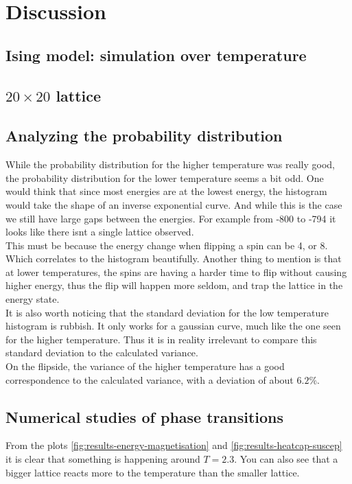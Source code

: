 \documentclass[../main.tex]{subfiles}
\begin{document}
\section{Discussion}

\subsection{Ising model: simulation over temperature}




\subsection{$20 \times 20$ lattice}




\subsection{Analyzing the probability distribution}
While the probability distribution for the higher temperature was really good, the probability distribution for the lower temperature seems a bit odd. One would think that since most energies are at the lowest energy, the histogram would take the shape of an inverse exponential curve. And while this is the case we still have large gaps between the energies. For example from -800 to -794 it looks like there isnt a single lattice observed. \\
This must be because the energy change when flipping a spin can be 4, or 8. Which correlates to the histogram beautifully. Another thing to mention is that at lower temperatures, the spins are having a harder time to flip without causing higher energy, thus the flip will happen more seldom, and trap the lattice in the energy state.\\
It is also worth noticing that the standard deviation for the low temperature histogram is rubbish. It only works for a gaussian curve, much like the one seen for the higher temperature. Thus it is in reality irrelevant to compare this standard deviation to the calculated variance.\\
On the flipside, the variance of the higher temperature has a good correspondence to the calculated variance, with a deviation of about $6.2\%$.


\subsection{Numerical studies of phase transitions}
From the plots \ref{fig:results-energy-magnetisation} and \ref{fig:results-heatcap-suscep} it is clear that something is happening around $T = 2.3$. You can also see that a bigger lattice reacts more to the temperature than the smaller lattice.\\
\end{document}
